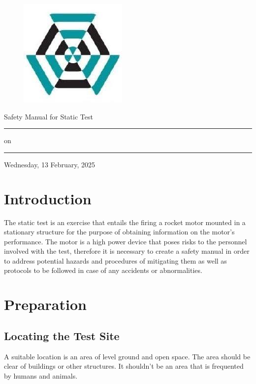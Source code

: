 \documentclass[12pt,letterpaper]{article}
\begin{document}
    \begin{center}
        \begin{figure}
            \centering
            \includegraphics[width=0.125\linewidth]{nakujalogo.jpeg}
        \end{figure}
        \huge{Safety Manual for Static Test}             \\
        \rule{\textwidth}{0em}
        \large{on} 							\\
        \rule{\textwidth}{0em}
        \large{Wednesday, 13 February, 2025}
    \end{center}

    \section{Introduction}
        \noindent The static test is an exercise that entails the firing a
        rocket motor mounted in a stationary structure for the purpose of
        obtaining information on the motor’s performance. The motor is a
        high power device that poses risks to the personnel involved with
        the test, therefore it is necessary to create a safety manual in
        order to address potential hazards and procedures of mitigating
        them as well as protocols to be followed in case of any accidents
        or abnormalities. 

    \section{Preparation}
        \subsection{Locating the Test Site}
	     \noindent A suitable location is an area of level ground and
             open space. The area should be clear of buildings or other
             structures. It shouldn’t be an area that is frequented by
             humans and animals.
\end{document}
